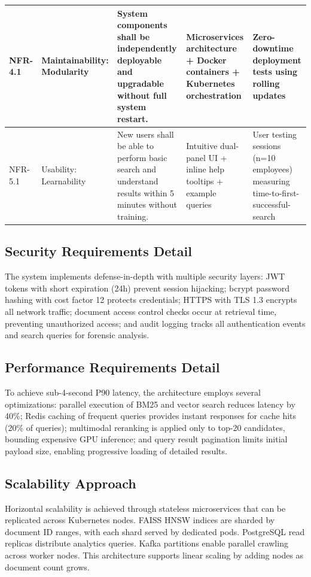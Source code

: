\begin{table}[H]
\begin{tabularx}{\textwidth}{|p{}|p{}|p{}|p{}|p{}|}
\hline
NFR-4.1 & Maintainability: Modularity & System components shall be independently deployable and upgradable without full system restart. & Microservices architecture + Docker containers + Kubernetes orchestration & Zero-downtime deployment tests using rolling updates \\
\hline
NFR-5.1 & Usability: Learnability & New users shall be able to perform basic search and understand results within 5 minutes without training. & Intuitive dual-panel UI + inline help tooltips + example queries & User testing sessions (n=10 employees) measuring time-to-first-successful-search \\
\hline
\end{tabularx}
\end{table}

\subsection{Security Requirements Detail}
The system implements defense-in-depth with multiple security layers: JWT tokens with short expiration (24h) prevent session hijacking; bcrypt password hashing with cost factor 12 protects credentials; HTTPS with TLS 1.3 encrypts all network traffic; document access control checks occur at retrieval time, preventing unauthorized access; and audit logging tracks all authentication events and search queries for forensic analysis.

\subsection{Performance Requirements Detail}
To achieve sub-4-second P90 latency, the architecture employs several optimizations: parallel execution of BM25 and vector search reduces latency by 40\%; Redis caching of frequent queries provides instant responses for cache hits (20\% of queries); multimodal reranking is applied only to top-20 candidates, bounding expensive GPU inference; and query result pagination limits initial payload size, enabling progressive loading of detailed results.

\subsection{Scalability Approach}
Horizontal scalability is achieved through stateless microservices that can be replicated across Kubernetes nodes. FAISS HNSW indices are sharded by document ID ranges, with each shard served by dedicated pods. PostgreSQL read replicas distribute analytics queries. Kafka partitions enable parallel crawling across worker nodes. This architecture supports linear scaling by adding nodes as document count grows.

